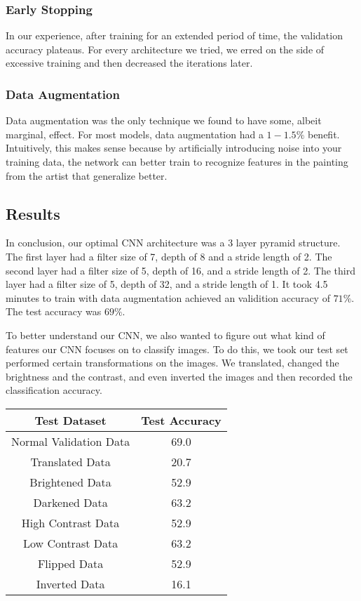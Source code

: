 \documentclass[10pt,twoside]{article}
\begin{document}
\subsubsection{Early Stopping}
In our experience, after training for an extended period of time, the validation accuracy plateaus. For every architecture we tried, we erred on the side of excessive training and then decreased the iterations later.

\subsubsection{Data Augmentation}
Data augmentation was the only technique we found to have some, albeit marginal, effect. For most models, data augmentation had a $1-1.5\%$ benefit. Intuitively, this makes sense because by artificially introducing noise into your training data, the network can better train to recognize features in the painting from the artist that generalize better.


\subsection{Results}
In conclusion, our optimal CNN architecture was a 3 layer pyramid structure. The first layer had a filter size of 7, depth of 8 and a stride length of 2. The second layer had a filter size of 5, depth of 16, and a stride length of 2. The third layer had a filter size of 5, depth of 32, and a stride length of 1. It took 4.5 minutes to train with data augmentation achieved an validition accuracy of $71\%$. The test accuracy was $69\%$.

To better understand our CNN, we also wanted to figure out what kind of features our CNN focuses on to classify images. To do this, we took our test set performed certain transformations on the images. We translated, changed the brightness and the contrast, and even inverted the images and then recorded the classification accuracy.

\begin{center}
 \begin{tabular}{||c c||} 
 \hline
 Test Dataset & Test Accuracy \\ [0.5ex] 
 \hline\hline
 Normal Validation Data & 69.0 \\ 
 \hline
 Translated Data & 20.7 \\ 
 \hline
 Brightened Data & 52.9 \\ 
 \hline
 Darkened Data & 63.2 \\ 
 \hline
 High Contrast Data & 52.9 \\ 
 \hline
 Low Contrast Data & 63.2 \\ 
 \hline
 Flipped Data & 52.9 \\ 
 \hline
 Inverted Data & 16.1 \\ 
 \hline
\end{tabular}
\end{center}
\end{document}
